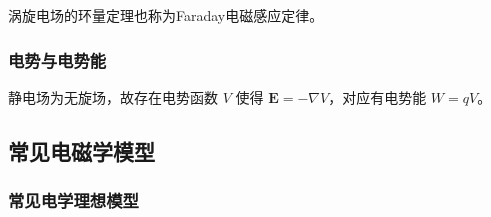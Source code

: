 \documentclass[UTF8,fontset=fandol,zihao=5]{ctexart}
\newcommand{\vect}[1]{\bm{#1}}
\begin{document}
涡旋电场的环量定理也称为Faraday电磁感应定律。

\subsubsection{电势与电势能}

静电场为无旋场，故存在电势函数 \(V\) 使得 \(\vect E=-\nabla V\)，对应有电势能 \(W=qV\)。

\subsection{常见电磁学模型}

\subsubsection{常见电学理想模型}
\end{document}
